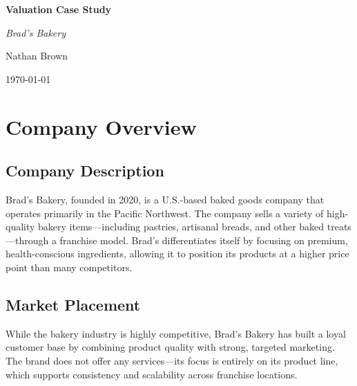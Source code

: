 \documentclass[11pt]{article}
\begin{document}
\begin{center}
    \vspace*{0.5cm}
    {\Huge\bfseries Valuation Case Study\par}
    \vspace{0.8cm}
    {\LARGE\itshape Brad's Bakery\par}
    \vspace{0.8cm}
    {\large Nathan Brown\par}
    {\large \today\par}
    \vspace{1cm}
\end{center}

\tableofcontents
\newpage

\section{Company Overview}
    \subsection{Company Description}
        Brad’s Bakery, founded in 2020, is a U.S.-based baked goods company that operates primarily in the Pacific Northwest. The company sells a variety of high-quality bakery items—including pastries, artisanal breads, and other baked treats—through a franchise model. Brad’s differentiates itself by focusing on premium, health-conscious ingredients, allowing it to position its products at a higher price point than many competitors.
    \subsection{Market Placement}
        While the bakery industry is highly competitive, Brad’s Bakery has built a loyal customer base by combining product quality with strong, targeted marketing. The brand does not offer any services—its focus is entirely on its product line, which supports consistency and scalability across franchise locations.
\end{document}
